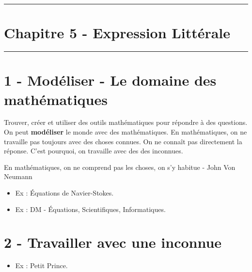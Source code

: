 \documentclass[11pt]{article}
\newcommand{\horrule}[1]{\rule{\linewidth}{#1}} %
\begin{document}

\newtheorem{Definition}{Définition}
\newtheorem{Theorem}{Théorème}
\newtheorem{Proposition}{Propriété}

\renewcommand{\labelitemi}{$\bullet$}
\renewcommand{\labelitemii}{$\circ$}

\setlength{\columnseprule}{1pt}

\horrule{2px}
\section*{Chapitre 5 - Expression Littérale}
\horrule{2px}

\section*{1 - Modéliser - Le domaine des mathématiques}

Trouver, créer et utiliser des outils mathématiques pour répondre à des questions. On peut \textbf{modéliser} le monde avec des mathématiques. En mathématiques, on ne travaille pas toujours avec des choses connues. On ne connaît pas directement la réponse. C'est pourquoi, on travaille avec des des inconnues. 

\begin{center}
{\selectfont 
\og En mathématiques, on ne comprend pas les choses, on s'y habitue \fg - John Von Neumann
}
\end{center}

\begin{itemize}
  \item Ex : Équations de Navier-Stokes.
  \item Ex : DM - Équations, Scientifiques, Informatiques.
\end{itemize}

\section*{2 - Travailler avec une inconnue}

\begin{itemize}
  \item Ex : Petit Prince.
\end{itemize}
\end{document}
